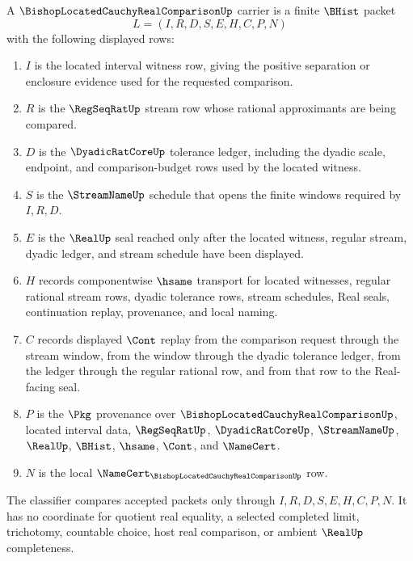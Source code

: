 \begin{definition}
\label{def:bishop-located-cauchy-real-comparison-carrier}
A $\BishopLocatedCauchyRealComparisonUp$ carrier is a finite $\BHist$ packet
$$
L=(I,R,D,S,E,H,C,P,N)
$$
with the following displayed rows:
\begin{enumerate}
\item $I$ is the located interval witness row, giving the positive separation or enclosure evidence used for the requested comparison.
\item $R$ is the $\RegSeqRatUp$ stream row whose rational approximants are being compared.
\item $D$ is the $\DyadicRatCoreUp$ tolerance ledger, including the dyadic scale, endpoint, and comparison-budget rows used by the located witness.
\item $S$ is the $\StreamNameUp$ schedule that opens the finite windows required by $I,R,D$.
\item $E$ is the $\RealUp$ seal reached only after the located witness, regular stream, dyadic ledger, and stream schedule have been displayed.
\item $H$ records componentwise $\hsame$ transport for located witnesses, regular rational stream rows, dyadic tolerance rows, stream schedules, Real seals, continuation replay, provenance, and local naming.
\item $C$ records displayed $\Cont$ replay from the comparison request through the stream window, from the window through the dyadic tolerance ledger, from the ledger through the regular rational row, and from that row to the Real-facing seal.
\item $P$ is the $\Pkg$ provenance over $\BishopLocatedCauchyRealComparisonUp$, located interval data, $\RegSeqRatUp$, $\DyadicRatCoreUp$, $\StreamNameUp$, $\RealUp$, $\BHist$, $\hsame$, $\Cont$, and $\NameCert$.
\item $N$ is the local $\NameCert_{\BishopLocatedCauchyRealComparisonUp}$ row.
\end{enumerate}
The classifier compares accepted packets only through $I,R,D,S,E,H,C,P,N$. It has no coordinate for quotient real equality, a selected completed limit, trichotomy, countable choice, host real comparison, or ambient $\RealUp$ completeness.
\end{definition}

